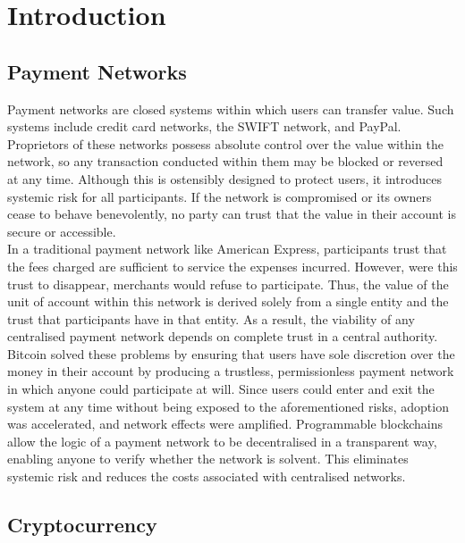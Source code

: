 \section{Introduction}

\subsection{Payment Networks}

\noindent Payment networks are closed systems within which users can transfer
value. Such systems include credit card networks, the SWIFT network, and
PayPal. Proprietors of these networks possess absolute control over the value
within the network, so any transaction conducted within them may be blocked
or reversed at any time. Although this is ostensibly designed to protect
users, it introduces systemic risk for all participants. If the network is
compromised or its owners cease to behave benevolently, no party can trust
that the value in their account is secure or accessible. \\

\noindent In a traditional payment network like American Express,
participants trust that the fees charged are sufficient to service the
expenses incurred. However, were this trust to disappear, merchants would
refuse to participate. Thus, the value of the unit of account within this
network is derived solely from a single entity and the trust that
participants have in that entity. As a result, the viability of any
centralised payment network depends on complete trust in a central authority.
\\

\noindent Bitcoin solved these problems by ensuring that users have sole
discretion over the money in their account by producing a trustless,
permissionless payment network in which anyone could participate at will.
Since users could enter and exit the system at any time without being exposed
to the aforementioned risks, adoption was accelerated, and network effects
were amplified. Programmable blockchains allow the logic of a payment network
to be decentralised in a transparent way, enabling anyone to verify whether the
network is solvent. This eliminates systemic risk and reduces the costs associated
with centralised networks.

\subsection{Cryptocurrency}

